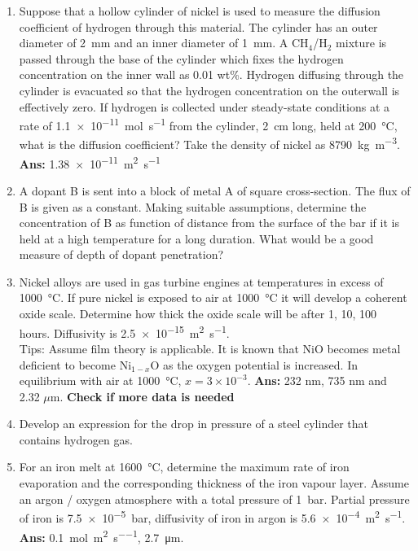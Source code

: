 \begin{enumerate}
\item Suppose that a hollow cylinder of nickel is used to measure the diffusion coefficient of hydrogen through this material. The cylinder has an outer diameter of \SI{2}{\milli\meter} and an inner diameter of \SI{1}{\milli\meter}. A CH$_4$/H$_2$ mixture is passed through the base of the cylinder which fixes the hydrogen concentration on the inner wall as 0.01 wt\%. Hydrogen diffusing through the cylinder is evacuated so that the hydrogen concentration on the outerwall is effectively zero. If hydrogen is collected under steady-state conditions at a rate of \SI{1.1e-11}{\mole\per\second} from the cylinder, \SI{2}{\centi\meter} long, held at \SI{200}{\celsius}, what is the diffusion coefficient? Take the density of nickel as \SI{8790}{\kilo\gram\per\meter\cubed}. {\bf Ans:} \SI{1.38e-11}{\meter\squared\per\second}

\item A dopant B is sent into a block of metal A of square cross-section. The flux of B is given as a constant. Making suitable assumptions, determine the concentration of B as function of distance from the surface of the bar if it is held at a high temperature for a long duration. What would be a good measure of depth of dopant penetration?

\item Nickel alloys are used in gas turbine engines at temperatures in excess of \SI{1000}{\celsius}. If pure nickel is exposed to air at \SI{1000}{\celsius} it will develop a coherent oxide scale. Determine how thick the oxide scale will be after 1, 10, 100 hours. Diffusivity is \SI{2.5e-15}{\meter\squared\per\second}. \\
Tips: Assume film theory is applicable. It is known that NiO becomes metal deficient to become Ni$_{1-x}$O as the oxygen potential is increased. In equilibrium with air at \SI{1000}{\celsius}, $x=3\times10^{-3}$.  {\bf Ans:} 232 nm, 735 nm and 2.32 $\mu$m.
{\bf Check if more data is needed}

\item Develop an expression for the drop in pressure of a steel cylinder that contains hydrogen  gas. 

\item For an iron melt at \SI{1600}{\celsius}, determine the maximum rate of iron evaporation and the corresponding thickness of the iron vapour layer. Assume an argon / oxygen atmosphere with a total pressure of \SI{1}{\bar}. Partial pressure of iron is \SI{7.5e-5}{\bar}, diffusivity of iron in argon is \SI{5.6e-4}{\meter\squared\per\second}. {\bf Ans:} \SI{0.1}{\mol\per\meter\squared\per\second}, \SI{2.7}{\micro\meter}.



\end{enumerate}
